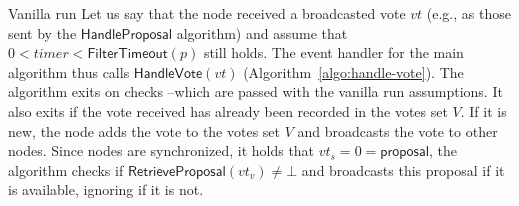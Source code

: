 \documentclass[10pt,a4paper]{article}
\begin{document}
\begin{section}{Vanilla run}
    Let us say that the node received a broadcasted vote $vt$ (e.g., as those sent by the $\mathsf{HandleProposal}$ 
    algorithm) and assume that $0<timer<\mathsf{FilterTimeout}(p)$ still holds.
    The event handler for the main algorithm thus calls $\mathsf{HandleVote}(vt)$ (Algorithm~\ref{algo:handle-vote}).
    The algorithm exits on checks --which are passed with the vanilla run assumptions.
    It also exits if the vote received has already been recorded in the votes set $V$.
    If it is new, the node adds the vote to the votes set $V$ and broadcasts the vote 
    to other nodes.
    Since nodes are synchronized, it holds that $vt_s=0=\mathsf{proposal}$, the algorithm checks if 
    $\mathsf{RetrieveProposal}(vt_v) \neq \bot$ and broadcasts this proposal if it is available, ignoring if it is not.
    

\end{section}
\end{document}
